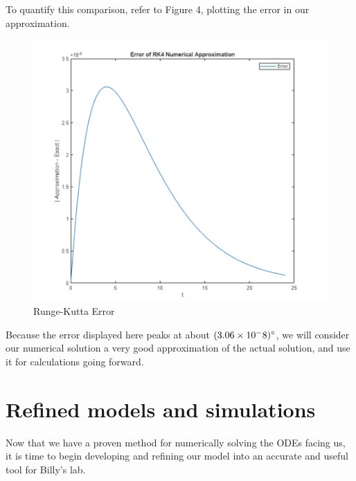 \documentclass[12pt]{article}
\begin{document}
To quantify this comparison, refer to Figure 4, plotting the error in our approximation. 

\begin{figure}[H]
    \centering
    \includegraphics[width=0.75\linewidth]{images/Task_B2.png}
    \caption{Runge-Kutta Error}
    \label{fig:placeholder}
\end{figure}

Because the error displayed here peaks at about $(3.06\times10^-8)\degree$, we will consider our numerical solution a very good approximation of the actual solution, and use it for calculations going forward. 


\section{Refined models and simulations}
Now that we have a proven method for numerically solving the ODEs facing us, it is time to begin developing and refining our model into an accurate and useful tool for Billy's lab.
\end{document}
